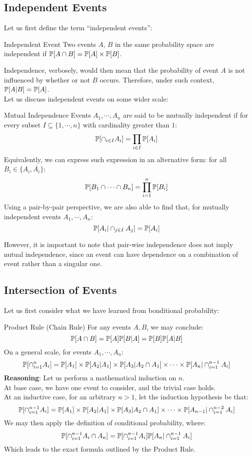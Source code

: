 \subsection{Independent Events}
Let us first define the term ``independent events'':
\begin{ln-define}{Independent Event}{}
    Two events $A$, $B$ in the same probability space are independent if $\P[A \cap B] = \P[A] \times \P[B]$.
\end{ln-define}
Independence, verbosely, would then mean that the probability of event $A$ is not influenced by whether or not $B$ occurs. Therefore, under such context, $\P[A|B] = \P[A]$. \\
Let us discuss independent events on some wider scale:
\begin{ln-define}{Mutual Independence}{}
    Events $A_1, \cdots, A_n$ are said to be mutually independent if for every subset $I \subseteq \{1, \cdots, n\}$ with cardinality greater than $1$:
    \[\P[\cap_{i \in I} A_i] = \prod_{i \in I} \P[A_i]\]
    Equivalently, we can express such expression in an alternative form: for all $B_i \in \{A_i, \overline{A_i}\}$:
    \[\P[B_1 \cap \cdots \cap B_n] = \prod_{i = 1}^n \P[B_i]\]
    Using a pair-by-pair perspective, we are also able to find that, for mutually independent events $A_1, \cdots, A_n$:
    \[\P[A_i | \cap_{j \in I} A_j] = \P[A_i]\]
\end{ln-define}
However, it is important to note that pair-wise independence does not imply nutual independence, since an event can have dependence on a combination of event rather than a singular one.

\subsection{Intersection of Events}
Let us first consider what we have learned from bonditional probability:
\begin{ln-theorem}{Product Rule (Chain Rule)}{}
    For any events $A, B$, we may conclude:
    \[\P[A \cap B] = \P[A] \P[B | A] = \P[B] \P[A | B]\]
    On a general scale, for events $A_1, \cdots, A_n$:
    \[\P[\cap_{i = 1}^n A_i] = \P[A_1] \times \P[A_2 | A_1] \times \P[A_3 | A_2 \cap A_1] \times \cdots \times \P[A_n | \cap_{i = 1}^{n-1} A_i]\]
    \tcblower
    \textbf{Reasoning}: Let us perform a mathematical induction on $n$. \\
    At base case, we have one event to consider, and the trivial case holds. \\
    At an inductive case, for an arbitrary $n > 1$, let the induction hypothesis be that:
    \[\P[\cap_{i = 1}^{n - 1} A_i] = \P[A_1] \times \P[A_2 | A_1] \times \P[A_3 | A_2 \cap A_1] \times \cdots \times \P[A_{n - 1} | \cap_{i = 1}^{n - 2} A_i]\]
    We may then apply the definition of conditional probability, where:
    \[\P[\cap_{i = 1}^{n - 1} A_i \cap A_n] = \P[\cap_{i = 1}^{n - 1} A_i] \P[A_n | \cap_{i = 1}^{n - 1} A_i]\]
    Which leads to the exact formula outlined by the Product Rule.
\end{ln-theorem}

